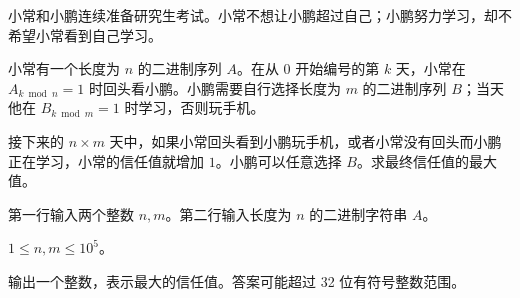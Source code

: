 \Legend
小常和小鹏连续准备研究生考试。小常不想让小鹏超过自己；小鹏努力学习，却不希望小常看到自己学习。

小常有一个长度为 $n$ 的二进制序列 $A$。在从 $0$ 开始编号的第 $k$ 天，小常在 $A_{k\bmod n}=1$ 时回头看小鹏。小鹏需要自行选择长度为 $m$ 的二进制序列 $B$；当天他在 $B_{k\bmod m}=1$ 时学习，否则玩手机。

接下来的 $n\times m$ 天中，如果小常回头看到小鹏玩手机，或者小常没有回头而小鹏正在学习，小常的信任值就增加 $1$。小鹏可以任意选择 $B$。求最终信任值的最大值。

\Input

第一行输入两个整数 $n,m$。第二行输入长度为 $n$ 的二进制字符串 $A$。

$1\le n,m\le 10^5$。

\Output

输出一个整数，表示最大的信任值。答案可能超过 32 位有符号整数范围。

\Examples

\begin{example}
\end{example}

\begin{example}
\end{example}
